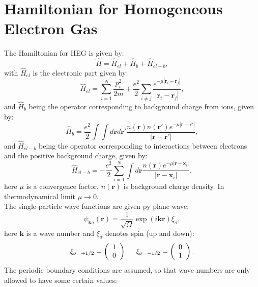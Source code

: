 \documentclass[twoside,english]{uiofysmaster}
\theoremstyle{definition}
\begin{document}
\section{Hamiltonian for Homogeneous Electron Gas}
The Hamiltonian for HEG is given by:
\begin{equation}
\hat{H}=\hat{H}_{el}+\hat{H}_{b}+\hat{H}_{el-b},
\end{equation}
with $\hat{H}_{el}$ is the electronic part given by:
\begin{equation}
\hat{H}_{el}=\sum_{i=1}^N\frac{p_i^2}{2m}+\frac{e^2}{2}\sum_{i\ne j}\frac{e^{-\mu |\mathbf{r}_i-\mathbf{r}_j|}}{|\mathbf{r}_i-\mathbf{r}_j|},
\end{equation}
and $\hat{H}_{b}$ being the operator corresponding to background charge from ions, given by:
\begin{equation}
\hat{H}_{b}=\frac{e^2}{2}\int\int d\mathbf{r}d\mathbf{r}'\frac{n(\mathbf{r})n(\mathbf{r}')e^{-\mu |\mathbf{r}-\mathbf{r}'|}}{|\mathbf{r}-\mathbf{r}'|},
\end{equation}
and $\hat{H}_{el-b}$ being the operator corresponding to interactions between electrons and the positive background charge, given by:
\begin{equation}
\hat{H}_{el-b}=-\frac{e^2}{2}\sum_{i=1}^N\int d\mathbf{r}\frac{n(\mathbf{r})e^{-\mu |\mathbf{r}-\mathbf{x}_i|}}{|\mathbf{r}-\mathbf{x}_i|},
\end{equation}
here $\mu$ is a convergence factor, $n(\textbf{r})$ is background charge density. In thermodynamical limit $\mu \rightarrow 0$. \\
The single-particle wave functions are given py plane wave:
\begin{equation}
\psi_{\mathbf{k}\sigma}(\mathbf{r})= \frac{1}{\sqrt{\Omega}}\exp{(i\mathbf{kr})}\xi_{\sigma},
\end{equation}
here $\mathbf{k}$ is a wave number and $\xi_{\sigma}$ denotes spin (up and down):
\begin{equation}
\xi_{\sigma=+1/2}=\left(\begin{array}{c} 1 \\ 0 \end{array}\right) \hspace{0.5cm}
\xi_{\sigma=-1/2}=\left(\begin{array}{c} 0 \\ 1 \end{array}\right).
\end{equation}
The periodic boundary conditions are assumed, so that wave numbers are only allowed to have some certain values:
\end{document}
